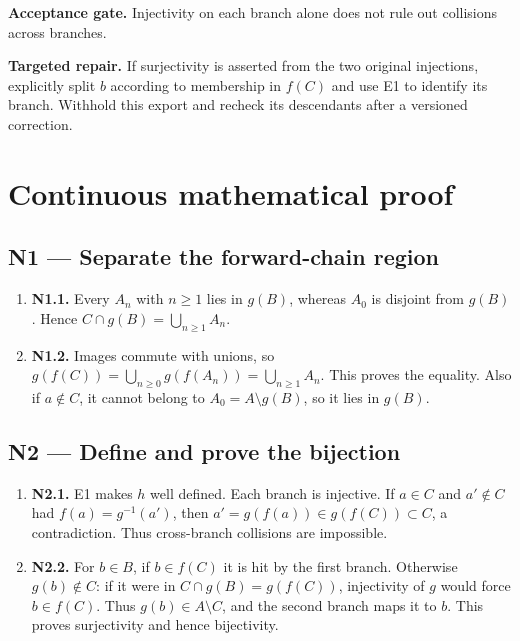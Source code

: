 \documentclass[preprint,12pt,aps,pra,showkeys,amsmath,amssymb,superscriptaddress,floatfix]{revtex4-2}
\theoremstyle{definition}
\theoremstyle{remark}
\newcommand{\field}[2]{\par\smallskip\noindent\textbf{#1.} #2\par}
\begin{document}
\field{Acceptance gate}{Injectivity on each branch alone does not rule out collisions across
branches.}

\field{Targeted repair}{If surjectivity is asserted from the two original injections, explicitly
split \(b\) according to membership in \(f(C)\) and use E1 to identify
its branch. Withhold this export and recheck its descendants after a
versioned correction.}

\endgroup\clearpage\section{Continuous mathematical proof}\label{sec:proof}

\subsection{N1 --- Separate the forward-chain
region}\label{n1-separate-the-forward-chain-region}

\begin{enumerate}
\def\labelenumi{\arabic{enumi}.}
\item
  \textbf{N1.1.} Every \(A_n\) with \(n\ge1\) lies in \(g(B)\), whereas
  \(A_0\) is disjoint from \(g(B)\). Hence
  \(C\cap g(B)=\bigcup_{n\ge1}A_n\).
\item
  \textbf{N1.2.} Images commute with unions, so
  \(g(f(C))=\bigcup_{n\ge0}g(f(A_n))=\bigcup_{n\ge1}A_n\). This proves
  the equality. Also if \(a\notin C\), it cannot belong to
  \(A_0=A\setminus g(B)\), so it lies in \(g(B)\).
\end{enumerate}

\subsection{N2 --- Define and prove the
bijection}\label{n2-define-and-prove-the-bijection}

\begin{enumerate}
\def\labelenumi{\arabic{enumi}.}
\item
  \textbf{N2.1.} E1 makes \(h\) well defined. Each branch is injective.
  If \(a\in C\) and \(a'\notin C\) had \(f(a)=g^{-1}(a')\), then
  \(a'=g(f(a))\in g(f(C))\subset C\), a contradiction. Thus cross-branch
  collisions are impossible.
\item
  \textbf{N2.2.} For \(b\in B\), if \(b\in f(C)\) it is hit by the first
  branch. Otherwise \(g(b)\notin C\): if it were in
  \(C\cap g(B)=g(f(C))\), injectivity of \(g\) would force
  \(b\in f(C)\). Thus \(g(b)\in A\setminus C\), and the second branch
  maps it to \(b\). This proves surjectivity and hence bijectivity.
\end{enumerate}
\end{document}
